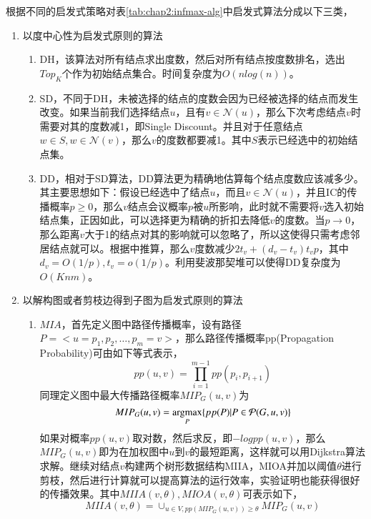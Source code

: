 根据不同的启发式策略对表\ref{tab:chap2:infmax-alg}中启发式算法分成以下三类，
\begin{enumerate}
\item 以度中心性为启发式原则的算法
\begin{enumerate}
\item DH\cite{hu2015rmdn}，该算法对所有结点求出度数，然后对所有结点按度数排名，选出$Top_{K}$个作为初始结点集合。时间复杂度为$O(nlog(n))$。
\item SD\cite{chen2009efficient}，不同于DH，未被选择的结点的度数会因为已经被选择的结点而发生改变。如果当前我们选择结点$u$，且有$v \in \mathcal{N}(u)$，那么下次考虑结点$v$时需要对其的度数减1，即Single Discount。并且对于任意结点$w \in S, w \in \mathcal{N}(v)$，那么$v$的度数都要减1。其中$S$表示已经选中的初始结点集。
\item DD\cite{chen2009efficient}，相对于SD算法，DD算法更为精确地估算每个结点度数应该减多少。其主要思想如下：假设已经选中了结点$u$，而且$v \in \mathcal{N}(u)$，并且IC的传播概率$p \geq 0$，那么$v$结点会议概率$p$被$u$所影响，此时就不需要将$v$选入初始结点集，正因如此，可以选择更为精确的折扣去降低$v$的度数。当$p \to 0$，那么距离$v$大于1的结点对其的影响就可以忽略了，所以这使得只需考虑邻居结点就可以。根据\cite{chen2009efficient}中推算，那么$v$度数减少$2t_{v} + (d_{v}-t_{v})t_{v}p$，其中$d_{v}=O(1/p), t_{v}=o(1/p)$。利用斐波那契堆可以使得DD复杂度为$O(Knm)$。
\end{enumerate}
\item 以解构图或者剪枝边得到子图为启发式原则的算法
\begin{enumerate}
\item $MIA$\cite{chen2010scalableKDD}，首先定义图中路径传播概率，设有路径$P=<u=p_{1},p_{2},\dots,p_{m}=v>$，那么路径传播概率pp(Propagation Probability)可由如下等式表示，
\begin{displaymath}pp(u,v)=\prod_{i=1}^{m-1}pp(p_{i}, p_{i+1})\end{displaymath}同理定义图中最大传播路径概率$MIP_{G}(u,v)$为
\begin{displaymath}MIP_{G}(u,v)=\mathop{\rm argmax} \limits_{P}\{pp(P)|P \in \mathcal{P}(G, u, v)\}\end{displaymath}如果对概率$pp(u,v)$取对数，然后求反，即$-logpp(u,v)$，那么$MIP_{G}(u,v)$即为在加权图中$u$到$v$的最短距离，这样就可以用Dijkstra算法求解。继续对结点$v$构建两个树形数据结构MIIA，MIOA并加以阈值$\theta$进行剪枝，然后进行计算就可以提高算法的运行效率，实验证明也能获得很好的传播效果。其中$MIIA(v, \theta),MIOA(v, \theta)$可表示如下，
\begin{displaymath}
MIIA(v, \theta)=\cup_{u \in V,pp(MIP_{G}(u, v)) \geq \theta}MIP_{G}(u,v)

\end{displaymath}
\end{enumerate}
\end{enumerate}
